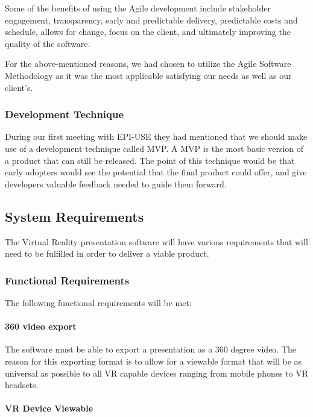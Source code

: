 Some of the benefits of using the Agile development include stakeholder engagement, transparency, early and predictable delivery, predictable costs and schedule, allows for change, focus on the client, and ultimately improving the quality of the software.

For the above-mentioned reasons, we had chosen to utilize the Agile Software Methodology as it was the most applicable satisfying our needs as well as our client's.

	\subsubsection{Development Technique}
	During our first meeting with EPI-USE they had mentioned that we should make use of a development technique called MVP. A MVP is the most basic version of a product that can still be released. The point of this technique would be that early adopters would see the potential that the final product could offer, and give developers valuable feedback needed to guide them forward.

\subsection{System Requirements}

The Virtual Reality presentation software will have various requirements that will need to be fulfilled in order to deliver a viable product.

	\subsubsection{Functional Requirements}

	The following functional requirements will be met:

		\paragraph{360 video export}

		The software must be able to export a presentation as a 360 degree video.
		The reason for this exporting format is to allow for a viewable format that will be as universal as possible to all VR capable devices ranging from mobile phones to VR headsets.

		\paragraph{VR Device Viewable}

